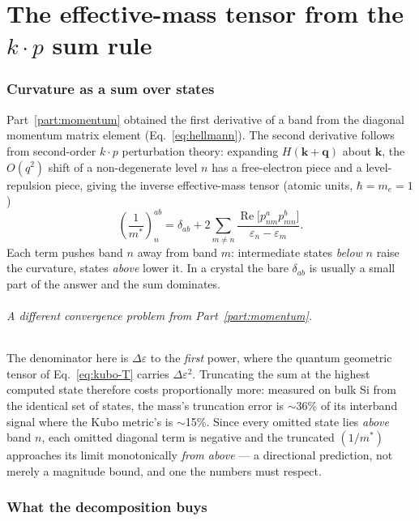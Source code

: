 \documentclass[11pt]{article}
\begin{document}
\part{The effective-mass tensor from the $k\cdot p$ sum rule}
\label{part:effmass}

\section{Curvature as a sum over states}

Part~\ref{part:momentum} obtained the first derivative of a band from the
diagonal momentum matrix element (Eq.~\eqref{eq:hellmann}). The second
derivative follows from second-order $k\cdot p$ perturbation theory: expanding
$H(\mathbf k+\mathbf q)$ about $\mathbf k$, the $O(q^2)$ shift of a
non-degenerate level $n$ has a free-electron piece and a level-repulsion piece,
giving the inverse effective-mass tensor (atomic units, $\hbar=m_e=1$)
\begin{equation}
  \left(\frac{1}{m^*}\right)^{ab}_{n}
    = \delta_{ab} + 2\sum_{m\neq n}
      \frac{\operatorname{Re}\big[p^a_{nm}p^b_{mn}\big]}
           {\varepsilon_n-\varepsilon_m}.
  \label{eq:kp-mass}
\end{equation}
Each term pushes band $n$ away from band $m$: intermediate states \emph{below}
$n$ raise the curvature, states \emph{above} lower it. In a crystal the bare
$\delta_{ab}$ is usually a small part of the answer and the sum dominates.

\paragraph{A different convergence problem from Part~\ref{part:momentum}.} The
denominator here is $\Delta\varepsilon$ to the \emph{first} power, where the
quantum geometric tensor of Eq.~\eqref{eq:kubo-T} carries $\Delta\varepsilon^2$.
Truncating the sum at the highest computed state therefore costs
proportionally more: measured on bulk Si from the identical set of states, the
mass's truncation error is $\sim$36\% of its interband signal where the Kubo
metric's is $\sim$15\%. Since every omitted state lies \emph{above} band $n$,
each omitted diagonal term is negative and the truncated
$(1/m^*)$ approaches its limit monotonically \emph{from above} --- a directional
prediction, not merely a magnitude bound, and one the numbers must respect.

\section{What the decomposition buys}
\end{document}
